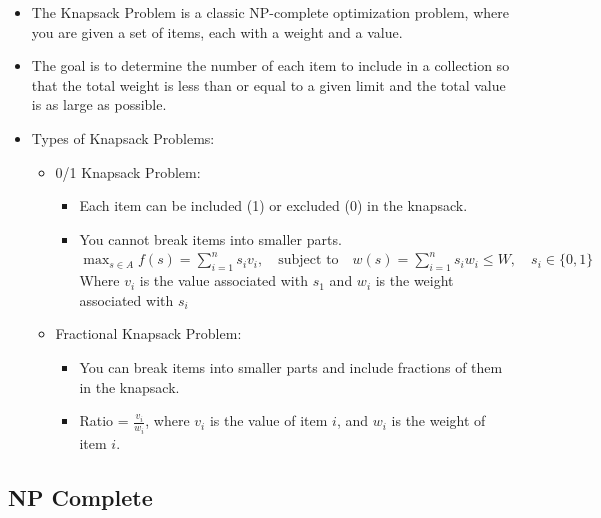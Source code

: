 \documentclass[
  letterpaper,
  DIV=11,
  numbers=noendperiod]{scrreprt}
\providecommand{\tightlist}{%
  \setlength{\itemsep}{0pt}\setlength{\parskip}{0pt}}\usepackage{longtable,booktabs,array}
\begin{document}
\begin{itemize}
\item
  The Knapsack Problem is a classic NP-complete optimization problem,
  where you are given a set of items, each with a weight and a value.
\item
  The goal is to determine the number of each item to include in a
  collection so that the total weight is less than or equal to a given
  limit and the total value is as large as possible.
\item
  Types of Knapsack Problems:

  \begin{itemize}
  \tightlist
  \item
    0/1 Knapsack Problem:

    \begin{itemize}
    \tightlist
    \item
      Each item can be included (1) or excluded (0) in the knapsack.
    \item
      You cannot break items into smaller parts.
      \(\max_{s \in A} f(s) = \sum_{i=1}^{n} s_i v_i, \quad \text{subject to} \quad w(s) = \sum_{i=1}^{n} s_i w_i \leq W, \quad s_i \in \{0, 1\}\)
      Where \(v_i\) is the value associated with \(s_1\) and \(w_i\) is
      the weight associated with \(s_i\)
    \end{itemize}
  \item
    Fractional Knapsack Problem:

    \begin{itemize}
    \tightlist
    \item
      You can break items into smaller parts and include fractions of
      them in the knapsack.
    \item
      Ratio = \(\frac{v_i}{w_i}\), where \(v_i\) is the value of item
      \(i\), and \(w_i\) is the weight of item \(i\).
    \end{itemize}
  \end{itemize}
\end{itemize}

\subsection{NP Complete}\label{np-complete}
\end{document}
